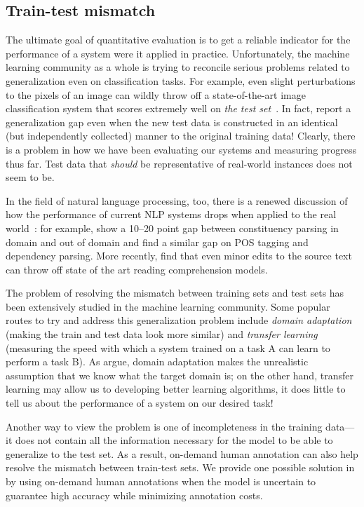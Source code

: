 \subsection{Train-test mismatch}
The ultimate goal of quantitative evaluation is to get a reliable indicator for the performance of a system were it applied in practice.
Unfortunately, the machine learning community as a whole is trying to reconcile serious problems related to generalization even on classification tasks.
For example, even slight perturbations to the pixels of an image can wildly throw off a state-of-the-art image classification system that scores extremely well on \textit{the test set}~\citep{goodfellow2015explaining,carlini2016defensive,carlini2017adversarial}.
In fact, \citet{recht2018cifar} report a generalization gap even when the new test data is constructed in an identical (but independently collected) manner to the original training data!
Clearly, there is a problem in how we have been evaluating our systems and measuring progress thus far.
Test data that \textit{should} be representative of real-world instances does not seem to be.

In the field of natural language processing, too,
  there is a renewed discussion of how the performance of current NLP systems drops when applied to the real world~\citep{plank16nonstandard}:
for example, \citet{mcclosky2010any} show a 10--20 point gap between constituency parsing in domain and out of domain and \citet{foster2011news} find a similar gap on POS tagging and dependency parsing.
More recently, \citet{jia2017adversarial} find that even minor edits to the source text can throw off state of the art reading comprehension models.

The problem of resolving the mismatch between training sets and test sets has been extensively studied in the machine learning community.
Some popular routes to try and address this generalization problem include \textit{domain adaptation}~\citep{plank2011domain} (making the train and test data look more similar) and \textit{transfer learning}~\citep{weiss2016survey} (measuring the speed with which a system trained on a task A can learn to perform a task B).
As \citet{plank16nonstandard} argue, domain adaptation makes the unrealistic assumption that we know what the target domain is;
  on the other hand, transfer learning may allow us to developing better learning algorithms, it does little to tell us about the performance of a system on our desired task!

Another way to view the problem is one of incompleteness in the training data---it does not contain all the information necessary for the model to be able to generalize to the test set.
As a result, on-demand human annotation can also help resolve the mismatch between train-test sets.
We provide one possible solution in  by using on-demand human annotations when the model is uncertain to guarantee high accuracy while minimizing annotation costs.

